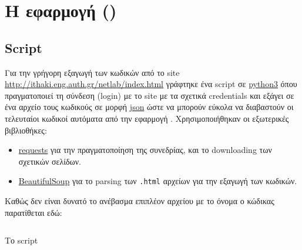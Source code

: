 \chapter{Η εφαρμογή (\appname{})}
\section{Script \scriptname{}}
Για την γρήγορη εξαγωγή των κωδικών από το site \url{http://ithaki.eng.auth.gr/netlab/index.html} γράφτηκε ένα script σε
\href{https://www.python.org/}{python3}
όπου πραγματοποιεί τη σύνδεση (login) με το site με τα σχετικά credentials και εξάγει σε ένα αρχείο τους κωδικούς σε μορφή
\href{https://en.wikipedia.org/wiki/JSON}{json} ώστε να μπορούν εύκολα να διαβαστούν οι τελευταίοι κωδικοί αυτόματα από την εφαρμογή \appname{}.
Χρησιμοποιήθηκαν οι εξωτερικές βιβλιοθήκες:
\begin{itemize}
\item \href{http://docs.python-requests.org/en/master/}{requests} για την πραγματοποίηση της συνεδρίας, και το downloading των σχετικών σελίδων.
\item \href{http://www.crummy.com/software/BeautifulSoup/}{BeautifulSoup} για το parsing των \texttt{.html} αρχείων για την εξαγωγή των κωδικών.
\end{itemize}

Καθώς δεν είναι δυνατό το ανέβασμα επιπλέον αρχείου με το όνομα \scriptname{} ο κώδικας παρατίθεται εδώ:
\begin{code}
\inputminted[frame=single, breaklines=true, linenos=true, python3=true]{python}{../extract-codes.py}
\caption{Το script \scriptname{}}
\label{listing:extract-codes}
\end{code}

